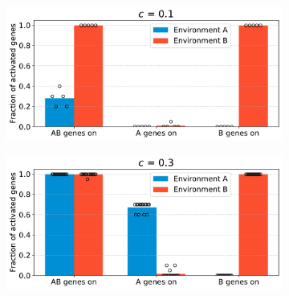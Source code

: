 \begin{figure}[H]
  \centering
  \begin{subfigure}[t]{0.49\textwidth}
    \includegraphics[width=\textwidth]{alife/img/mean_activation_inter-coef-0.1.pdf}
    \label{subfig:alife:param_c_1}
  \end{subfigure}
  \begin{subfigure}[t]{0.49\textwidth}
    \includegraphics[width=\textwidth]{alife/img/mean_activation_inter_coef.pdf}
    \label{subfig:alife:param_c_2}
  \end{subfigure}


\end{figure}
